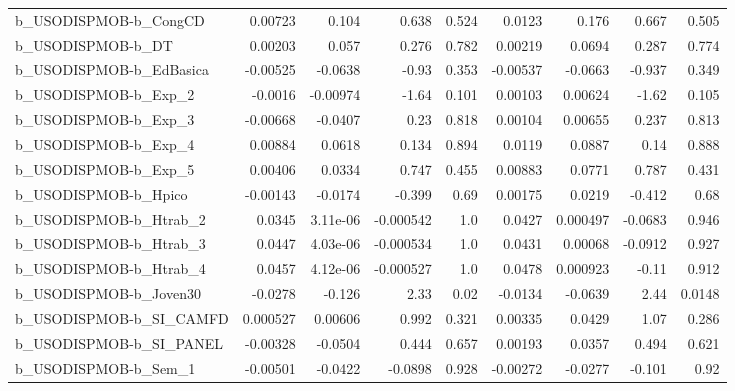 \begin{tabular}{lrrrrrrrr}
b\_USODISPMOB-b\_CongCD      &     0.00723 &        0.104 &     0.638 &    0.524 &     0.0123 &       0.176 &        0.667 &         0.505 \\
b\_USODISPMOB-b\_DT          &     0.00203 &        0.057 &     0.276 &    0.782 &    0.00219 &      0.0694 &        0.287 &         0.774 \\
b\_USODISPMOB-b\_EdBasica    &    -0.00525 &      -0.0638 &     -0.93 &    0.353 &   -0.00537 &     -0.0663 &       -0.937 &         0.349 \\
b\_USODISPMOB-b\_Exp\_2       &     -0.0016 &     -0.00974 &     -1.64 &    0.101 &    0.00103 &     0.00624 &        -1.62 &         0.105 \\
b\_USODISPMOB-b\_Exp\_3       &    -0.00668 &      -0.0407 &      0.23 &    0.818 &    0.00104 &     0.00655 &        0.237 &         0.813 \\
b\_USODISPMOB-b\_Exp\_4       &     0.00884 &       0.0618 &     0.134 &    0.894 &     0.0119 &      0.0887 &         0.14 &         0.888 \\
b\_USODISPMOB-b\_Exp\_5       &     0.00406 &       0.0334 &     0.747 &    0.455 &    0.00883 &      0.0771 &        0.787 &         0.431 \\
b\_USODISPMOB-b\_Hpico       &    -0.00143 &      -0.0174 &    -0.399 &     0.69 &    0.00175 &      0.0219 &       -0.412 &          0.68 \\
b\_USODISPMOB-b\_Htrab\_2     &      0.0345 &     3.11e-06 & -0.000542 &      1.0 &     0.0427 &    0.000497 &      -0.0683 &         0.946 \\
b\_USODISPMOB-b\_Htrab\_3     &      0.0447 &     4.03e-06 & -0.000534 &      1.0 &     0.0431 &     0.00068 &      -0.0912 &         0.927 \\
b\_USODISPMOB-b\_Htrab\_4     &      0.0457 &     4.12e-06 & -0.000527 &      1.0 &     0.0478 &    0.000923 &        -0.11 &         0.912 \\
b\_USODISPMOB-b\_Joven30     &     -0.0278 &       -0.126 &      2.33 &     0.02 &    -0.0134 &     -0.0639 &         2.44 &        0.0148 \\
b\_USODISPMOB-b\_SI\_CAMFD    &    0.000527 &      0.00606 &     0.992 &    0.321 &    0.00335 &      0.0429 &         1.07 &         0.286 \\
b\_USODISPMOB-b\_SI\_PANEL    &    -0.00328 &      -0.0504 &     0.444 &    0.657 &    0.00193 &      0.0357 &        0.494 &         0.621 \\
b\_USODISPMOB-b\_Sem\_1       &    -0.00501 &      -0.0422 &   -0.0898 &    0.928 &   -0.00272 &     -0.0277 &       -0.101 &          0.92 \\

\end{tabular}
